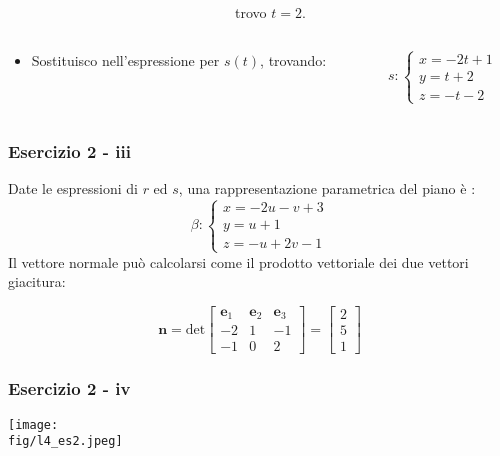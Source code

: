 \documentclass{beamer}
\newcommand{\fig}{./figures} %
\begin{document}
\begin{frame}
\begin{columns}
\begin{column}{0.4\textwidth}
\begin{displaymath}
\end{displaymath}
\end{column}
\begin{column}{0.29\textwidth}
trovo $t = 2$.
\end{column}
\end{columns}
\begin{columns}
\begin{column}{0.48\textwidth}
\begin{itemize}
\item Sostituisco nell'espressione per $s(t)$, trovando:
\end{itemize}
\end{column}
\begin{column}{0.48\textwidth}
\begin{displaymath}
s:
\begin{cases}
x  = -2t + 1 \\
y  =  t  + 2 \\
z  = -t  - 2
\end{cases}
\end{displaymath}
\end{column}
\end{columns}
\end{frame}
%
\begin{frame}
\frametitle{Esercizio 2 - iii}
Date le espressioni di $r$ ed $s$, una rappresentazione parametrica del piano \`e : 
\begin{displaymath}
\beta:\begin{cases}
x = -2u-v +3\\
y = u+1\\
z = -u+2v-1
\end{cases}
\end{displaymath}
Il vettore normale pu\`o calcolarsi come il prodotto vettoriale dei due vettori giacitura:

\begin{displaymath}
\mathbf{n} =
\mbox{det}
\begin{bmatrix}
\mathbf{e}_1 & \mathbf{e}_2 & \mathbf{e}_3\\
-2 & 1 & -1 \\
-1 & 0 & 2
\end{bmatrix}
=
\begin{bmatrix}
2\\5\\1
\end{bmatrix}
\end{displaymath}
\end{frame}
%
\begin{frame}
\frametitle{Esercizio 2 - iv}
\begin{center}
\texttt{[image: \\fig/l4\_es2.jpeg]}
\end{center}
\end{frame}
\end{document}
